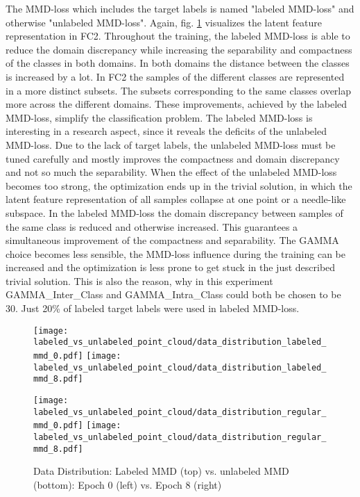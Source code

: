 The MMD-loss which includes the target labels is named "labeled MMD-loss" and otherwise "unlabeled MMD-loss". Again, fig. \ref{fig:point_cloud_labeled_unlabeled_mmd} visualizes the latent feature representation in FC2. Throughout the training, the labeled MMD-loss is able to reduce the domain discrepancy while increasing the separability and compactness of the classes in both domains. In both domains the distance between the classes is increased by a lot. In FC2 the samples of the different classes are represented in a more distinct subsets. The subsets corresponding to the same classes overlap more across the different domains. These improvements, achieved by the labeled MMD-loss, simplify the classification problem. The labeled MMD-loss is interesting in a research aspect, since it reveals the deficits of the unlabeled MMD-loss. Due to the lack of target labels, the unlabeled MMD-loss must be tuned carefully and mostly improves the compactness and domain discrepancy and not so much the separability. When the effect of the unlabeled MMD-loss becomes too strong, the optimization ends up in the trivial solution, in which the latent feature representation of all samples collapse at one point or a needle-like subspace. In the labeled MMD-loss the domain discrepancy between samples of the same class is reduced and otherwise increased. This guarantees a simultaneous improvement of the compactness and separability. The GAMMA choice becomes less sensible, the MMD-loss influence during the training can be increased and the optimization is less prone to get stuck in the just described trivial solution. This is also the reason, why in this experiment GAMMA\_Inter\_Class and GAMMA\_Intra\_Class could both be chosen to be 30. Just 20\% of labeled target labels were used in labeled MMD-loss.

\begin{figure}[htp]
  \centering
  \texttt{[image: labeled\_vs\_unlabeled\_point\_cloud/data\_distribution\_labeled\_mmd\_0.pdf]}
  \hspace{.4cm}
  \texttt{[image: labeled\_vs\_unlabeled\_point\_cloud/data\_distribution\_labeled\_mmd\_8.pdf]}

  \vspace{.1cm}

  \texttt{[image: labeled\_vs\_unlabeled\_point\_cloud/data\_distribution\_regular\_mmd\_0.pdf]}
  \hspace{.4cm}
  \texttt{[image: labeled\_vs\_unlabeled\_point\_cloud/data\_distribution\_regular\_mmd\_8.pdf]}
  
  \caption{Data Distribution: Labeled MMD (top) vs. unlabeled MMD (bottom): Epoch 0 (left) vs. Epoch 8 (right)}
  \label{fig:point_cloud_labeled_unlabeled_mmd}
\end{figure}

